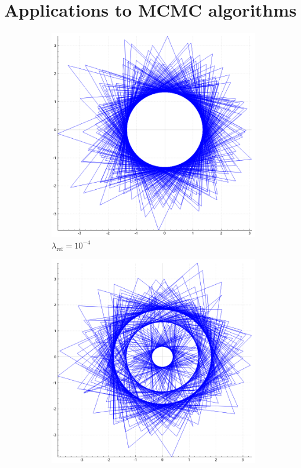 \documentclass[report.tex]{subfiles}
\begin{document}
\chapter{Applications to MCMC algorithms}
\label{chapter-bouncy-particle-sampler}



\begin{figure}
  \captionsetup{skip=0.75cm}
  \centering
  \begin{subfigure}{.25\textwidth}
    \includegraphics[width=\textwidth]{img/bps_ref_0_0001}
    \caption*{$\lambda_{\text{ref}} = 10^{-4}$}
  \end{subfigure}
  \begin{subfigure}{.25\textwidth}
    \includegraphics[width=\textwidth]{img/bps_ref_0_001}

\end{subfigure}
\end{figure}
\end{document}
